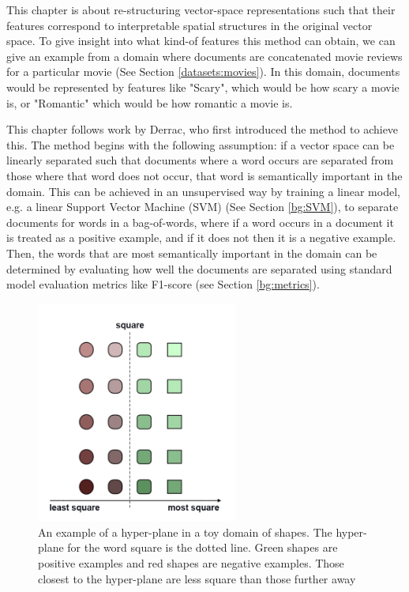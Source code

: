  


This chapter is about re-structuring vector-space representations such that  their  features correspond to interpretable spatial structures in the original vector space. To give insight into what kind-of features this method can obtain, we can give an example from a domain where documents are concatenated movie reviews for a particular movie (See Section \ref{datasets:movies}). In this domain, documents would be represented by features like "Scary", which would be how scary a movie is, or "Romantic" which would be how romantic a movie is.

This chapter follows work by Derrac\cite{Derrac2015}, who first introduced the method to achieve this. The method begins with the following assumption: if a vector space can be linearly separated such that documents where a word occurs are separated from those where that word does not occur, that word is semantically important in the domain. This can be achieved in an unsupervised way by training a linear model, e.g. a linear Support Vector Machine (SVM) (See Section \ref{bg:SVM}), to separate documents for words in a bag-of-words, where if a word occurs in a document it is treated as a positive example, and if it does not then it is a negative example. Then, the words that are most semantically important in the domain can be determined by evaluating how well the documents are separated using standard model evaluation metrics like F1-score (see Section \ref{bg:metrics}).

\begin{figure}[t]
	\includegraphics[width=250px]{images/Toyhyperplane1Direction.png}
	\centering
	\caption{An example of a hyper-plane in a toy domain of shapes. The hyper-plane for the word square is the dotted line. Green shapes are positive examples and red shapes are negative examples. Those closest to the hyper-plane are less square than those further away}\label{ch3:HyperPlaneNoDir}
\end{figure}



